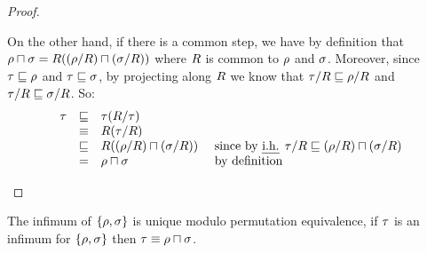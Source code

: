 \begin{proof}
\begin{enumerate}
  On the other hand, if there is a common step, we have by definition that
  $\rho \sqcap \sigma = R((\rho/R) \sqcap (\sigma/R))$
  where $R$ is common to $\rho$ and $\sigma$.
  Moreover, since $\tau \sqsubseteq \rho$ and $\tau \sqsubseteq \sigma$,
  by projecting along $R$ we know that
  $\tau/R \sqsubseteq \rho/R$ and $\tau/R \sqsubseteq \sigma/R$.
  So:
  \[
    \begin{array}{rcll}
      \redseqthree & \permle & \redseqthree(\redex/\redseqthree) \\
                   & \permeq & \redex(\redseqthree/\redex) \\
                   & \permle & \redex((\redseq/\redex) \sqcap (\redseqtwo/\redex)) & \text{ since by \ih $\redseqthree/\redex \permle (\redseq/\redex) \sqcap (\redseqtwo/\redex)$} \\
                   & =       & \redseq \sqcap \redseqtwo & \text{ by definition}
    \end{array}
  \]
\end{enumerate}
\end{proof}

\begin{remark}
The infimum of $\{\rho,\sigma\}$ is unique modulo permutation equivalence,
\ie if $\tau$ is an infimum for $\{\rho,\sigma\}$ then $\tau \equiv \rho \sqcap \sigma$.
\end{remark}



